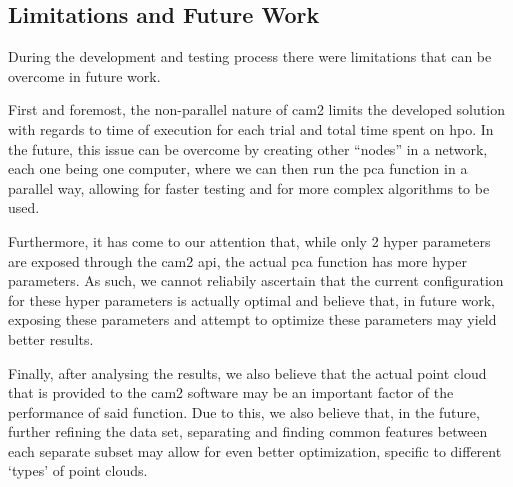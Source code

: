 
\subsection{Limitations and Future Work}
\label{sec:futurework}

During the development and testing process there were limitations that can be overcome in future work.

First and foremost, the non-parallel nature of \acrshort{cam2} limits the developed solution with regards to time of execution for each trial and total time spent on \acrshort{hpo}. In the future, this issue can be overcome by creating other ``nodes'' in a network, each one being one computer, where we can then run the \acrshort{pca} function in a parallel way, allowing for faster testing and for more complex algorithms to be used.

Furthermore, it has come to our attention that, while only 2 hyper parameters are exposed through the \acrshort{cam2} \acrshort{api}, the actual \acrshort{pca} function has more hyper parameters. As such, we cannot reliabily ascertain that the current configuration for these hyper parameters is actually optimal and believe that, in future work, exposing these parameters and attempt to optimize these parameters may yield better results.

Finally, after analysing the results, we also believe that the actual point cloud that is provided to the \acrshort{cam2} software may be an important factor of the performance of said function. Due to this, we also believe that, in the future, further refining the data set, separating and finding common features between each separate subset may allow for even better optimization, specific to different `types' of point clouds.